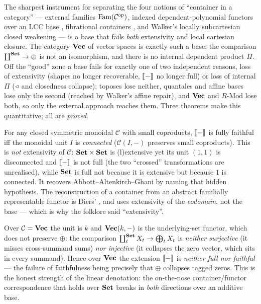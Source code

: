 The sharpest instrument for separating the four notions of ``container in a
category'' --- external families $\mathrm{Fam}(\mathcal{C}^{\mathrm{op}})$, indexed
dependent-polynomial functors over an LCC base \cite{GambinoKock}, fibrational
containers \cite{vonGlehn}, and Walker's locally subcartesian closed weakening
\cite{Walker} --- is a base that fails \emph{both} extensivity and local cartesian
closure. The category $\mathbf{Vec}$ of vector spaces is exactly such a base: the
comparison $\coprod^{\mathbf{Set}}\to\oplus$ is not an isomorphism, and there is no
internal dependent product $\Pi$. Off the ``good'' zone a base fails for exactly
one of two independent reasons, loss of extensivity (shapes no longer recoverable,
$\llbracket - \rrbracket$ no longer full) or loss of internal $\Pi$ ($\triangleleft$ and closedness
collapse); toposes lose neither, quantales and affine bases lose only the second
(reached by Walker's affine repair), and $\mathbf{Vec}$ and $R\text{-}\mathrm{Mod}$ lose
both, so only the external approach reaches them. Three theorems make this
quantitative; all are \emph{proved}.

\begin{theorem}[Fullness $=$ unit-connectedness; \emph{proved}]\label{thm:cob-T1}
For any closed symmetric monoidal $\mathcal{C}$ with small coproducts, $\llbracket - \rrbracket$ is
fully faithful iff the monoidal unit $I$ is \emph{connected}
($\mathcal{C}(I,-)$ preserves small coproducts). This is \emph{not} extensivity of
$\mathcal{C}$: $\mathbf{Set}\times\mathbf{Set}$ is (l)extensive yet its unit $(1,1)$ is
disconnected and $\llbracket - \rrbracket$ is not full (the two ``crossed'' transformations are
unrealised), while $\mathbf{Set}$ is full not because it is extensive but because $1$ is
connected. It recovers Abbott--Altenkirch--Ghani \cite{AAG} by naming that hidden
hypothesis. The reconstruction of a container from an abstract familially
representable functor is Diers' \cite{Diers}, and uses extensivity of the
\emph{codomain}, not the base --- which is why the folklore said ``extensivity''.
\end{theorem}

\begin{corollary}\label{cor:cob-veccollapse}
Over $\mathcal{C}=\mathbf{Vec}$ the unit is $k$ and $\mathbf{Vec}(k,-)$ is the underlying-set
functor, which does not preserve $\oplus$: the comparison $\coprod^{\mathbf{Set}}_t
X_t\to\bigoplus_t X_t$ is \emph{neither surjective} (it misses cross-summand sums)
\emph{nor injective} (it collapses the zero vector, which sits in every summand).
Hence over $\mathbf{Vec}$ the extension $\llbracket - \rrbracket$ is \emph{neither full nor faithful} ---
the failure of faithfulness being precisely that $\oplus$ collapses tagged zeros.
This is the honest strength of the linear denotation: the on-the-nose
container/functor correspondence that holds over $\mathbf{Set}$ breaks in \emph{both}
directions over an additive base.
\end{corollary}


